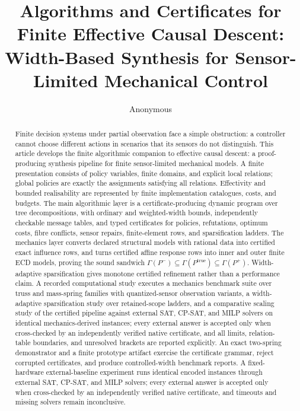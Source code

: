 \documentclass[11pt]{article}
\title{Algorithms and Certificates for Finite Effective Causal Descent:\\
Width-Based Synthesis for Sensor-Limited Mechanical Control}
\author{Anonymous}
\date{}
\theoremstyle{plain}
\theoremstyle{definition}
\theoremstyle{remark}
\begin{document}
\maketitle

\begin{abstract}
Finite decision systems under partial observation face a simple obstruction: a
controller cannot choose different actions in scenarios that its sensors do not
distinguish.  This article develops the finite algorithmic companion to
effective causal descent: a proof-producing synthesis pipeline for finite
sensor-limited mechanical models.  A finite presentation consists of policy variables, finite domains, and
explicit local relations; global policies are exactly the assignments satisfying
all relations.  Effectivity and bounded realisability are represented by finite
implementation catalogues, costs, and budgets.  The main algorithmic layer is a
certificate-producing dynamic program over tree decompositions, with ordinary
and weighted-width bounds, independently checkable message tables, and typed
certificates for policies, refutations, optimum costs, fibre conflicts, sensor
repairs, finite-element rows, and sparsification ladders.  The mechanics layer
converts declared structural models with rational data into certified exact
influence rows, and turns certified affine response rows into inner and outer
finite ECD models, proving the sound sandwich
\(\Gamma(P^-)\subseteq\Gamma(P^{\mathrm{true}})\subseteq\Gamma(P^+)\).
Width-adaptive sparsification gives monotone certified refinement rather than a
performance claim.  A recorded computational study executes a mechanics
benchmark suite over truss and mass-spring families with quantized-sensor
observation variants, a width-adaptive sparsification study over retained-scope
ladders, and a comparative scaling study of the certified pipeline against
external SAT, CP-SAT, and MILP solvers on identical mechanics-derived
instances; every external answer is accepted only when cross-checked by an
independently verified native certificate, and all limits, relation-table
boundaries, and unresolved brackets are reported explicitly.  An exact two-spring demonstrator and a finite prototype
artifact exercise the certificate grammar, reject corrupted certificates, and
produce controlled-width benchmark reports.  A fixed-hardware external-baseline
experiment runs identical encoded instances through external SAT, CP-SAT, and
MILP solvers; every external answer is accepted only when cross-checked by an
independently verified native certificate, and timeouts and missing solvers
remain inconclusive.
\end{abstract}
\end{document}
